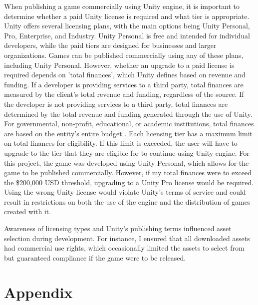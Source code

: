 \documentclass[10pt]{final_report}
\begin{document}
When publishing a game commercially using Unity engine, it is important to determine whether a paid Unity license is required and what tier is appropriate. Unity offers several licensing plans, with the main options being Unity Personal, Pro, Enterprise, and Industry. Unity Personal is free and intended for individual developers, while the paid tiers are designed for businesses and larger organizations.
Games can be published commercially using any of these plans, including Unity Personal. However, whether an upgrade to a paid license is required depends on 'total finances', which Unity defines based on revenue and funding. If a developer is providing services to a third party, total finances are measured by the client’s total revenue and funding, regardless of the source. If the developer is not providing services to a third party, total finances are determined by the total revenue and funding generated through the use of Unity. For governmental, non-profit, educational, or academic institutions, total finances are based on the entity’s entire budget \cite{UnityTC}.
Each licensing tier has a maximum limit on total finances for eligibility. If this limit is exceeded, the user will have to upgrade to the tier that they are eligible for to continue using Unity engine. For this project, the game was developed using Unity Personal, which allows for the game to be published commercially. However, if my total finances were to exceed the \$200,000 USD threshold, upgrading to a Unity Pro license would be required. Using the wrong Unity license would violate Unity's terms of service and could result in restrictions on both the use of the engine and the distribution of games created with it.\newline

Awareness of licensing types and Unity’s publishing terms influenced asset selection during development. For instance, I ensured that all downloaded assets had commercial use rights, which occasionally limited the assets to select from but guaranteed compliance if the game were to be released.


\appendix
\chapter{Appendix}
\end{document}
